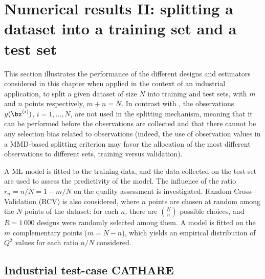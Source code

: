 \section{Numerical results II: splitting a dataset into a training set and a test set}\label{sec:val_res2}
This section illustrates the performance of the different designs and estimators considered in this chapter when applied in the context of an industrial application, to split a given dataset of size $N$ into training and test sets, with $m$ and $n$ points respectively, $m+n=N$. 
In contrast with \citet{josvak21}, the observations $y(\bx^{(i)})$, $i=1,\ldots,N$, are not used in the splitting mechanism, meaning that it can be performed before the observations are collected and that there cannot be any selection bias related to observations 
(indeed, the use of observation values in a MMD-based splitting criterion may favor the allocation of the most different observations to different sets, training versus validation).

A ML model is fitted to the training data, and the data collected on the test-set are used to assess the predictivity of the model. 
The influence of the ratio $r_n=n/N=1-m/N$ on the quality assessment is investigated. 
Random Cross-Validation (RCV) is also considered, where $n$ points are chosen at random among the $N$ points of the dataset: for each $n$, there are $N \choose n$ possible choices, and $R=1\,000$ designs were randomly selected among them. 
A model is fitted on the $m$ complementary points ($m=N-n$), which yields an empirical distribution of $Q^2$ values for each ratio $n/N$ considered. 

\subsection{Industrial test-case CATHARE}

